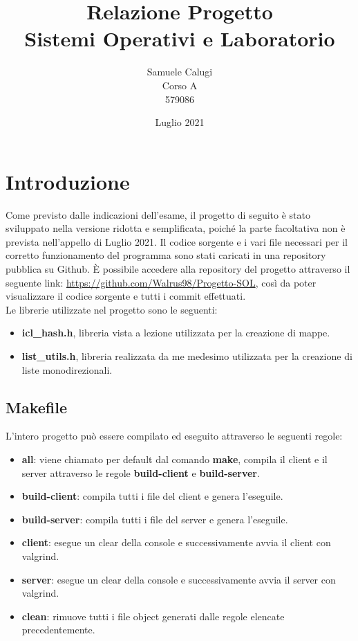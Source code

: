 \documentclass{article}
\title{Relazione Progetto \\ Sistemi Operativi e Laboratorio}
\date{Luglio 2021}
\author{Samuele Calugi\\ Corso A \\ 579086}
\begin{document}
\maketitle
\tableofcontents

\section{Introduzione}
Come previsto dalle indicazioni dell'esame, il progetto di seguito è stato sviluppato nella versione ridotta e semplificata, poiché la parte facoltativa non è 
prevista nell'appello di Luglio 2021. Il codice sorgente e i vari file necessari per il corretto funzionamento del programma sono stati caricati in una repository
pubblica su Github. È possibile accedere alla repository del progetto attraverso il seguente link: \url{https://github.com/Walrus98/Progetto-SOL}, così da poter 
visualizzare il codice sorgente e tutti i commit effettuati. \\ Le librerie utilizzate nel progetto sono le seguenti:
\begin{itemize}
    \itemsep 0em 
    \item \textbf{icl\_hash.h}, libreria vista a lezione utilizzata per la creazione di mappe.
    \item \textbf{list\_utils.h}, libreria realizzata da me medesimo utilizzata per la creazione di liste monodirezionali.
\end{itemize}

\subsection{Makefile}
L'intero progetto può essere compilato ed eseguito attraverso le seguenti regole:

\begin{itemize}
    \itemsep 0em 
    \item \textbf{all}: viene chiamato per default dal comando \textbf{make}, compila il client e il server attraverso le regole \textbf{build-client} e \textbf{build-server}. 
    \item \textbf{build-client}: compila tutti i file del client e genera l'eseguile.
    \item \textbf{build-server}: compila tutti i file del server e genera l'eseguile.
    \item \textbf{client}: esegue un clear della console e successivamente avvia il client con valgrind.
    \item \textbf{server}: esegue un clear della console e successivamente avvia il server con valgrind.
    \item \textbf{clean}: rimuove tutti i file object generati dalle regole elencate precedentemente.
\end{itemize}
\end{document}
